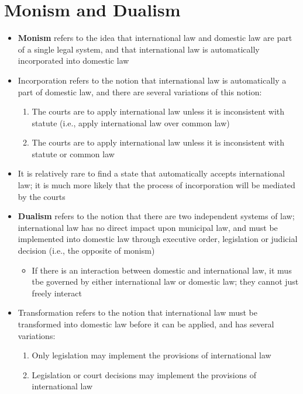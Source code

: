 \section{Monism and Dualism}
\begin{itemize}
    \item \textbf{Monism} refers to the idea that international law and domestic law are part of a single legal system, and that international law is automatically incorporated into domestic law
    \item Incorporation refers to the notion that international law is automatically a part of domestic law, and there are several variations of this notion:
    \begin{enumerate}[label=(\alph*)]
        \item The courts are to apply international law unless it is inconsistent with statute (i.e., apply international law over common law)
        \item The courts are to apply international law unless it is inconsistent with statute or common law
    \end{enumerate}
    \item It is relatively rare to find a state that automatically accepts international law; it is much more likely that the process of incorporation will be mediated by the courts
    \item \textbf{Dualism} refers to the notion that there are two independent systems of law; international law has no direct impact upon municipal law, and must be implemented into domestic law through executive order, legislation or judicial decision (i.e., the opposite of monism)
    \begin{itemize}
        \item If there is an interaction between domestic and international law, it mus tbe governed by either international law or domestic law; they cannot just freely interact
    \end{itemize}
    \item Transformation refers to the notion that international law must be transformed into domestic law before it can be applied, and has several variations:
    \begin{enumerate}[label=(\alph*)]
        \item Only legislation may implement the provisions of international law
        \item Legislation or court decisions may implement the provisions of international law
    \end{enumerate}
\end{itemize}

